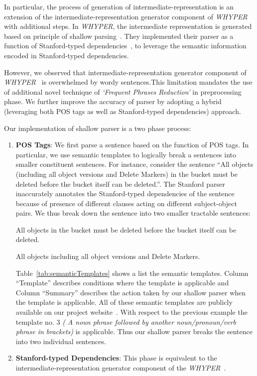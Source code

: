 In particular, the process of generation of intermediate-representation is an extension of the intermediate-representation generator component of \emph{WHYPER}~\cite{pandita13:WHYPER} with additional steps. In \emph{WHYPER}, the intermediate representation is generated based on principle of shallow parsing~\cite{Branimir2000}. They implemented their parser as a function of Stanford-typed dependencies~\cite{Marneffe06LREC,Marneffe08COLING,SNLP,KleinNIPS03}, to leverage the semantic information encoded in Stanford-typed dependencies.

However, we observed that intermediate-representation generator component of \emph{WHYPER}~\cite{pandita13:WHYPER} is overwhelmed by wordy sentences.This limitation mandates the use of additional novel technique of \textit{`Frequent Phrases Reduction'} in preprocessing phase. We further improve the accuracy of  parser by adopting a hybrid (leveraging both POS tags as well as Stanford-typed dependencies) approach.

Our implementation of shallow parser is a two phase process:

\begin{enumerate}
	\item{\textbf{POS Tags}}: We first parse a sentence based on the function of POS tags. In particular, we use semantic templates to logically break a sentences into smaller constituent sentences. For instance, consider the sentence \scriptsize``All objects (including all object versions and Delete Markers) in the bucket must be deleted before the bucket itself can be deleted.''. \normalsize The Stanford parser inaccurately annotates the Stanford-typed dependencies of the sentence because of presence of different clauses acting on different subject-object pairs. We thus break down the sentence into two smaller tractable sentences:
	
	 \scriptsize All objects in the bucket must be deleted before the bucket itself can be deleted.
	
	 All objects including all object versions and Delete Markers.\normalsize 
	 
	 Table~\ref{tab:semanticTemplates} shows a list the semantic templates. Column ``Template'' describes conditions where the template is applicable and Column ``Summary'' describes the action taken by our shallow parser when the template is applicable. All of these semantic templates are publicly available on our project website~\cite{projectweb}. With respect to the previous example the template no. 3 \textit{( A noun phrase followed by another noun/pronoun/verb phrase in brackets)} is applicable. Thus our shallow parser breaks the sentence into two individual sentences.
	 
	\item{\textbf{Stanford-typed Dependencies}}: This phase is equivalent to the intermediate-representation generator component of the \emph{WHYPER}~\cite{pandita13:WHYPER}.

\end{enumerate}

